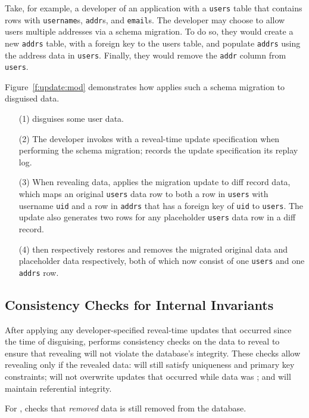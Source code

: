 %
Take, for example, a developer of an application with a \texttt{users} table
that contains rows with \texttt{username}s, \texttt{addr}s, and \texttt{email}s.
The developer may choose to allow users multiple addresses via a schema
migration. To do so, they would create a new \texttt{addrs} table, with a
foreign key to the users table, and populate \texttt{addrs} using the address
data in \texttt{users}.  Finally, they would remove the \texttt{addr} column
from \texttt{users}.
%

Figure~\ref{f:update:mod} demonstrates how \sys applies such a schema migration
to disguised data.  \begin{enumerate}[nosep]
    \item[(1)] \sys disguises some user data.
    \item[(2)] The developer invokes \sys with a reveal-time update
        specification when 
performing the schema migration; \sys records the update specification its replay log.
    \item[(3)] When revealing data, \sys applies the migration update
        to diff record data, which maps an original \texttt{users} data row to
        both
    a row in \texttt{users} with username \texttt{uid} and a row in
\texttt{addrs} that has a foreign key of \texttt{uid} to \texttt{users}.
%
The update also generates two rows for any placeholder \texttt{users}
data row in a diff record.
%
\item[(4)] \sys then respectively restores and removes the migrated original data and placeholder
        data respectively, both of which now consist of one \texttt{users} and
        one \texttt{addrs} row.
\end{enumerate}

\subsection{Consistency Checks for Internal Invariants} 
After applying any developer-specified reveal-time updates that occurred since
the time of disguising, \sys performs consistency checks on the data to reveal
to ensure that revealing will not violate the database's integrity.
%
These checks allow revealing only if the revealed data: \one{} will still
satisfy uniqueness and primary key constraints; \two{} will not overwrite
updates that occurred while data was \xxed; and \three{} will maintain
referential integrity.

For \one{}, \sys checks that \emph{removed} \xxed data is still removed from the
database.
%

